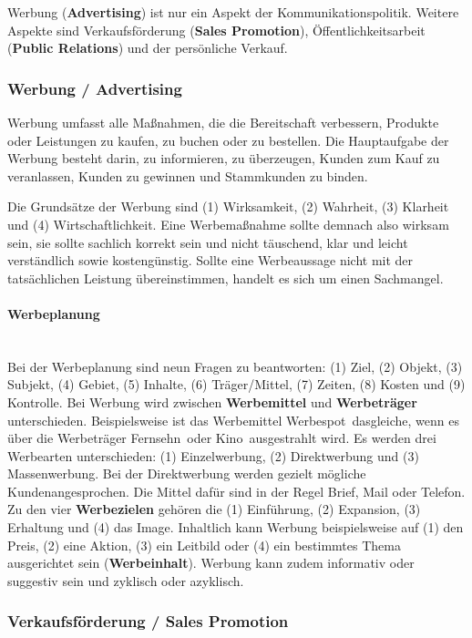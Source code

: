 {Werbung ({\bf Advertising}) ist nur ein Aspekt der Kommunikationspolitik. Weitere Aspekte sind Verkaufsförderung ({\bf Sales Promotion}), Öffentlichkeitsarbeit ({\bf Public Relations}) und der persönliche Verkauf.

\subsubsection{Werbung / Advertising}

Werbung umfasst alle Maßnahmen, die die Bereitschaft verbessern, Produkte oder Leistungen zu kaufen, zu buchen oder zu bestellen. Die Hauptaufgabe der Werbung besteht darin, zu informieren, zu überzeugen, Kunden zum Kauf zu veranlassen, Kunden zu gewinnen und Stammkunden zu binden.

Die Grundsätze der Werbung sind (1) Wirksamkeit, (2) Wahrheit, (3) Klarheit und (4) Wirtschaftlichkeit. Eine Werbemaßnahme sollte demnach also wirksam sein, sie sollte sachlich korrekt sein und nicht täuschend, klar und leicht verständlich sowie kostengünstig. Sollte eine Werbeaussage nicht mit der tatsächlichen Leistung übereinstimmen, handelt es sich um einen Sachmangel.

\paragraph{Werbeplanung}~\\

Bei der Werbeplanung sind neun Fragen zu beantworten: (1) Ziel, (2) Objekt, (3) Subjekt, (4) Gebiet, (5) Inhalte, (6) Träger/Mittel, (7) Zeiten, (8) Kosten und (9) Kontrolle. Bei Werbung wird zwischen {\bf Werbemittel} und {\bf Werbeträger} unterschieden. Beispielsweise ist das Werbemittel \ql Werbespot\qr\ dasgleiche, wenn es über die Werbeträger \ql Fernsehn\qr\ oder \ql Kino\qr\ ausgestrahlt wird. Es werden drei Werbearten unterschieden: (1) Einzelwerbung, (2) Direktwerbung und (3) Massenwerbung. Bei der Direktwerbung werden gezielt mögliche Kundenangesprochen. Die Mittel dafür sind in der Regel Brief, Mail oder Telefon. Zu den vier {\bf Werbezielen} gehören die (1) Einführung, (2) Expansion, (3) Erhaltung und (4) das Image. Inhaltlich kann Werbung beispielsweise auf (1) den Preis, (2) eine Aktion, (3) ein Leitbild oder (4) ein bestimmtes Thema ausgerichtet sein ({\bf Werbeinhalt}). Werbung kann zudem informativ oder suggestiv sein und zyklisch oder azyklisch.

\subsubsection{Verkaufsförderung / Sales Promotion}

}
